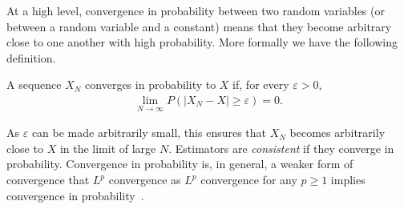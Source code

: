 At a high level, convergence in probability between two random variables (or between a random variable and
a constant) means that they become arbitrary close to one another with high probability.  More
formally we have the following definition.
\begin{definition}
A sequence $X_N$ converges in probability to $X$ if, for every $\varepsilon>0$,
\begin{align}
\lim\limits_{N\rightarrow\infty} P(\left|X_N-X\right|\ge\varepsilon)=0.
\end{align}
\end{definition}
As $\varepsilon$ can be made arbitrarily small, this ensures that $X_N$ becomes arbitrarily
close to $X$ in the limit of large $N$.  Estimators are \emph{consistent} if they converge
in probability.
Convergence in probability is, in general, a weaker form of convergence that $L^p$ convergence
as $L^p$ convergence for any $p\ge1$ implies convergence in probability~\citep{williams1991probability}.

